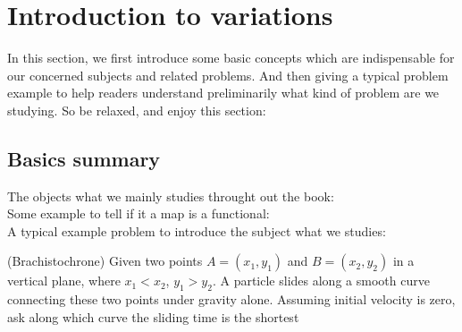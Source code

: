 \newpage
\section{Introduction to variations}
In this section, we first introduce some basic concepts which are indispensable for our concerned subjects and related problems. And then giving a typical problem example to help readers understand preliminarily what kind of problem are we studying. So be relaxed, and enjoy this section:

\subsection{Basics summary}
The objects what we mainly studies throught out the book: \\
\newline\newline
Some example to tell if it a map is a functional: \\
\newline\newline
A typical example problem to introduce the subject what we studies: 
\begin{prb}
    (Brachistochrone) Given two points $A = (x_1, y_1)$ and $B = (x_2, y_2)$ in a vertical plane, where $x_1 < x_2$, $y_1 > y_2$. A particle slides along a smooth curve connecting these two points under gravity alone. Assuming initial velocity is zero, ask along which curve the sliding time is the shortest
\end{prb}
